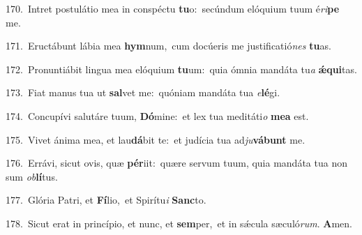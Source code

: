 {\numbfont\textcolor{\numbcolor}{170.}}~Intret postulátio mea in conspéctu \textbf{tu}\-o:~\star secúndum elóquium tuum é\-\textit{ri}\-\textbf{pe} me.\par
{\numbfont\textcolor{\numbcolor}{171.}}~Eructábunt lábia mea \textbf{hym}\-num,~\star cum docúeris me justificatió\textit{nes} \textbf{tu}\-as.\par
{\numbfont\textcolor{\numbcolor}{172.}}~Pronuntiábit lingua mea elóquium \textbf{tu}\-um:~\star quia ómnia mandáta tu\textit{a} \textbf{ǽ}\-\textbf{qui}tas.\par
{\numbfont\textcolor{\numbcolor}{173.}}~Fiat manus tua ut \textbf{sal}\-vet me:~\star quóniam mandáta tua \textit{e}\-\textbf{lé}gi.\par
{\numbfont\textcolor{\numbcolor}{174.}}~Concupívi salutáre tuum, \textbf{Dó}\-mine:~\star et lex tua meditáti\textit{o} \textbf{me}\-\textbf{a} est.\par
{\numbfont\textcolor{\numbcolor}{175.}}~Vivet ánima mea, et lau\-\textbf{dá}\-bit te:~\star et judícia tua ad\-\textit{ju}\-\textbf{vá}\textbf{bunt} me.\par
{\numbfont\textcolor{\numbcolor}{176.}}~Errávi, sicut ovis, quæ \textbf{pér}\-iit:~\star quære servum tuum, quia mandáta tua non sum \textit{ob}\-\textbf{lí}tus.\par
{\numbfont\textcolor{\numbcolor}{177.}}~Glória Patri, et \textbf{Fí}\-lio,~\star et Spirítu\textit{i} \textbf{Sanc}\-to.\par
{\numbfont\textcolor{\numbcolor}{178.}}~Sicut erat in princípio, et nunc, et \textbf{sem}\-per,~\star et in sǽcula sæculó\-\textit{rum}\-. \textbf{A}\-men.\par
